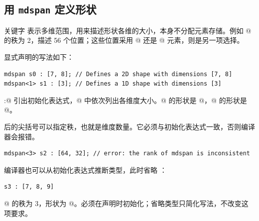 \subsection*{用 \texttt{mdspan} 定义形状}

关键字 \co@mdspan@ 表示多维范围，用来描述形状各维的大小，本身不分配元素存储。例如 \co@[7, 8]@ 的秩为 2，描述 56 个位置；这些位置采用 @ 还是 @ 元素，则是另一项选择。

显式声明的写法如下：

\begin{lstlisting}[language=croqtile,caption={声明形状}]
mdspan s0 : [7, 8]; // Defines a 2D shape with dimensions [7, 8]
mdspan<1> s1 : [3]; // Defines a 1D shape with dimensions [3]
\end{lstlisting}

\co@:@ 引出初始化表达式，\co@[]@ 中依次列出各维度大小。@ 的形状是 \co@[7, 8]@，@ 的形状是 \co@[3]@。

\co@mdspan@ 后的尖括号可以指定秩，也就是维度数量。它必须与初始化表达式一致，否则编译器会报错。

\begin{lstlisting}[language=croqtile,caption={秩不匹配}]
mdspan<3> s2 : [64, 32]; // error: the rank of mdspan is inconsistent
\end{lstlisting}

编译器也可以从初始化表达式推断类型，此时省略 \co@mdspan@：

\begin{lstlisting}[language=croqtile,caption={省略 mdspan 关键字}]
s3 : [7, 8, 9]
\end{lstlisting}

@ 的秩为 3，形状为 \co@[7, 8, 9]@。\co@mdspan@ 必须在声明时初始化；省略类型只简化写法，不改变这项要求。
